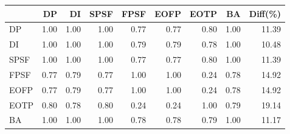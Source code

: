 \begin{tabular}{l|rrrrrrr|r}
\toprule
 & DP & DI & SPSF & FPSF & EOFP & EOTP & BA & Diff(\%)  \\
\midrule
DP & 1.00 & 1.00 & 1.00 & 0.77 & 0.77 & 0.80 & 1.00 & 11.39  \\
DI & 1.00 & 1.00 & 1.00 & 0.79 & 0.79 & 0.78 & 1.00 & 10.48  \\
SPSF & 1.00 & 1.00 & 1.00 & 0.77 & 0.77 & 0.80 & 1.00 & 11.39  \\
FPSF & 0.77 & 0.79 & 0.77 & 1.00 & 1.00 & 0.24 & 0.78 & 14.92  \\
EOFP & 0.77 & 0.79 & 0.77 & 1.00 & 1.00 & 0.24 & 0.78 & 14.92  \\
EOTP & 0.80 & 0.78 & 0.80 & 0.24 & 0.24 & 1.00 & 0.79 & 19.14  \\
BA & 1.00 & 1.00 & 1.00 & 0.78 & 0.78 & 0.79 & 1.00 & 11.17  \\
\bottomrule
\end{tabular}

